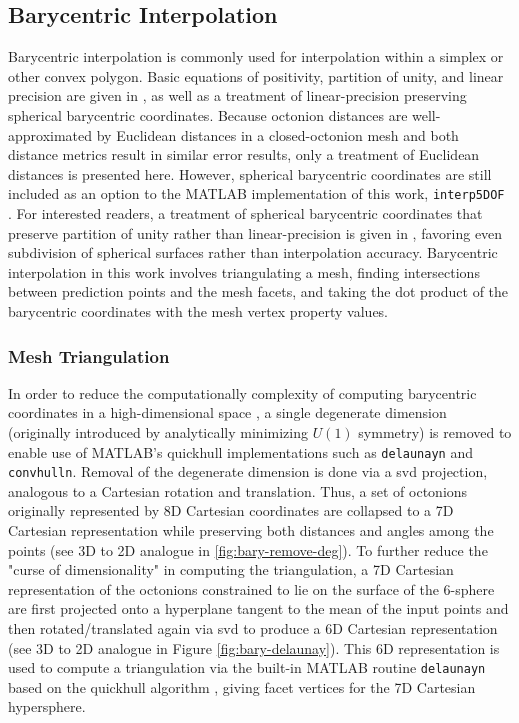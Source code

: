 \documentclass[preprint,12pt]{elsarticle}
\begin{document}

\subsection{Barycentric Interpolation} \label{sec:methods:bary}

Barycentric interpolation is commonly used for interpolation within a simplex or other convex polygon. Basic equations of positivity, partition of unity, and linear precision are given in \cite{langerSphericalBarycentricCoordinates2006}, as well as a treatment of linear-precision preserving spherical barycentric coordinates. Because octonion distances are well-approximated by Euclidean distances in a closed-octonion mesh and both distance metrics result in similar error results, only a treatment of Euclidean distances is presented here. However, spherical barycentric coordinates are still included as an option to the MATLAB implementation of this work, \texttt{interp5DOF} \cite{bairdFiveDegreeofFreedom5DOF2020}. For interested readers, a treatment of spherical barycentric coordinates that preserve partition of unity rather than linear-precision is given in \cite{leiNewCoordinateSystem2020}, favoring even subdivision of spherical surfaces rather than interpolation accuracy. Barycentric interpolation in this work involves triangulating a mesh, finding intersections between prediction points and the mesh facets, and taking the dot product of the barycentric coordinates with the mesh vertex property values.

\subsubsection{Mesh Triangulation}
In order to reduce the computationally complexity of computing barycentric coordinates in a high-dimensional space \cite{barberQuickhullAlgorithmConvex1996}, a single degenerate dimension (originally introduced by analytically minimizing $U(1)$ symmetry) is removed to enable use of MATLAB's quickhull \cite{barberQuickhullAlgorithmConvex1996} implementations such as \texttt{delaunayn} and \texttt{convhulln}. Removal of the degenerate dimension is done via a \gls{svd} projection, analogous to a Cartesian rotation and translation. Thus, a set of octonions originally represented by 8D Cartesian coordinates are collapsed to a 7D Cartesian representation while preserving both distances and angles among the points (see 3D to 2D analogue in \cref{fig:bary-remove-deg}). To further reduce the "curse of dimensionality" in computing the triangulation, a 7D Cartesian representation of the octonions constrained to lie on the surface of the 6-sphere are first projected onto a hyperplane tangent to the mean of the input points and then rotated/translated again via \gls{svd} to produce a 6D Cartesian representation (see 3D to 2D analogue in Figure \cref{fig:bary-delaunay}). This 6D representation is used to compute a triangulation via the built-in MATLAB routine \texttt{delaunayn} based on the quickhull algorithm \cite{barberQuickhullAlgorithmConvex1996}, giving facet vertices for the 7D Cartesian hypersphere.
\end{document}
